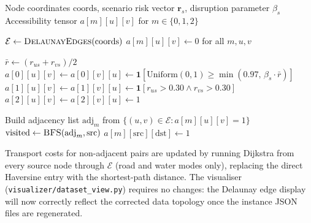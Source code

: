 \documentclass{llncs}
\begin{document}
\begin{algorithm}[h]
\caption{Topology-aware accessibility generation (per scenario $s$)}
\label{alg:accessibility}
\begin{algorithmic}[1]
\Require Node coordinates $\text{coords}$, scenario risk vector $\mathbf{r}_s$,
         disruption parameter $\beta_s$
\Ensure  Accessibility tensor $a[m][u][v]$ for $m \in \{0,1,2\}$

\State $\mathcal{E} \leftarrow \textsc{DelaunayEdges}(\text{coords})$
\State $a[m][u][v] \leftarrow 0$ for all $m,u,v$

  \State $\bar{r} \leftarrow (r_{us} + r_{vs})/2$
  \State $a[0][u][v] \leftarrow a[0][v][u] \leftarrow
         \mathbf{1}[\text{Uniform}(0,1) \geq \min(0.97,\,\beta_s \cdot \bar{r})]$
  \State $a[1][u][v] \leftarrow a[1][v][u] \leftarrow
         \mathbf{1}[r_{us} > 0.30 \wedge r_{vs} > 0.30]$
  \State $a[2][u][v] \leftarrow a[2][v][u] \leftarrow 1$
\EndFor

  \State Build adjacency list $\text{adj}_m$ from $\{(u,v)\in\mathcal{E} : a[m][u][v]=1\}$
    \State $\text{visited} \leftarrow \textsc{BFS}(\text{adj}_m, \text{src})$
      \State $a[m][\text{src}][\text{dst}] \leftarrow 1$
    \EndFor
  \EndFor
\EndFor
\end{algorithmic}
\end{algorithm}

Transport costs for non-adjacent pairs are updated by running Dijkstra from
every source node through $\mathcal{E}$ (road and water modes only),
replacing the direct Haversine entry with the shortest-path distance.
The visualiser (\texttt{visualizer/dataset\_view.py}) requires no changes:
the Delaunay edge display will now correctly reflect the corrected data
topology once the instance JSON files are regenerated.




\end{document}
